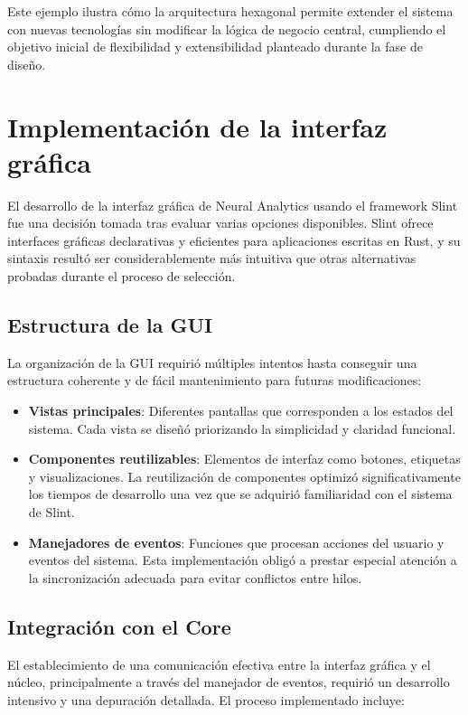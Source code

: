 \begin{enumerate}
Este ejemplo ilustra cómo la arquitectura hexagonal permite extender el sistema con nuevas tecnologías sin modificar la lógica de negocio central, cumpliendo el objetivo inicial de flexibilidad y extensibilidad planteado durante la fase de diseño.

\section{Implementación de la interfaz gráfica}

El desarrollo de la interfaz gráfica de Neural Analytics usando el framework Slint fue una decisión tomada tras evaluar varias opciones disponibles. Slint ofrece interfaces gráficas declarativas y eficientes para aplicaciones escritas en Rust, y su sintaxis resultó ser considerablemente más intuitiva que otras alternativas probadas durante el proceso de selección.

\subsection{Estructura de la GUI}

La organización de la GUI requirió múltiples intentos hasta conseguir una estructura coherente y de fácil mantenimiento para futuras modificaciones:

\begin{itemize}
    \item \textbf{Vistas principales}: Diferentes pantallas que corresponden a los estados del sistema. Cada vista se diseñó priorizando la simplicidad y claridad funcional.
    \item \textbf{Componentes reutilizables}: Elementos de interfaz como botones, etiquetas y visualizaciones. La reutilización de componentes optimizó significativamente los tiempos de desarrollo una vez que se adquirió familiaridad con el sistema de Slint.
    \item \textbf{Manejadores de eventos}: Funciones que procesan acciones del usuario y eventos del sistema. Esta implementación obligó a prestar especial atención a la sincronización adecuada para evitar conflictos entre hilos.
\end{itemize}

\subsection{Integración con el Core}

El establecimiento de una comunicación efectiva entre la interfaz gráfica y el núcleo, principalmente a través del manejador de eventos, requirió un desarrollo intensivo y una depuración detallada. El proceso implementado incluye:


\end{enumerate}
